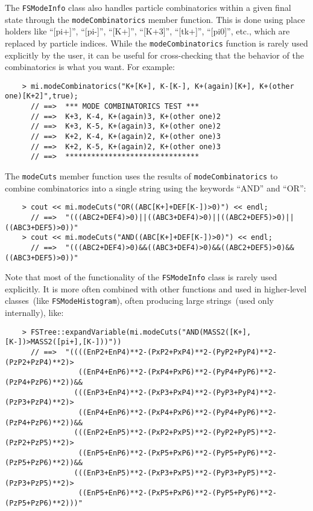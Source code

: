 \documentclass[11pt]{article}
\begin{document}
The {\tt FSModeInfo} class also handles particle combinatorics within a given final state through the {\tt modeCombinatorics} member function.  This is done using place holders like ``[pi+]'', ``[pi-]'', ``[K+]'', ``[K+3]'', ``[tk+]'', ``[pi0]'', etc., which are replaced by particle indices.  While the {\tt modeCombinatorics} function is rarely used explicitly by the user, it can be useful for cross-checking that the behavior of the combinatorics is what you want. For example:
\begin{verbatim}
    > mi.modeCombinatorics("K+[K+], K-[K-], K+(again)[K+], K+(other one)[K+2]",true);
      // ==>  *** MODE COMBINATORICS TEST ***
      // ==>  K+3, K-4, K+(again)3, K+(other one)2
      // ==>  K+3, K-5, K+(again)3, K+(other one)2
      // ==>  K+2, K-4, K+(again)2, K+(other one)3
      // ==>  K+2, K-5, K+(again)2, K+(other one)3
      // ==>  *******************************
\end{verbatim}

The {\tt modeCuts} member function uses the results of {\tt modeCombinatorics} to combine combinatorics into a single string using the keywords ``AND'' and ``OR'':
\begin{verbatim}
    > cout << mi.modeCuts("OR((ABC[K+]+DEF[K-])>0)") << endl;
      // ==>  "(((ABC2+DEF4)>0)||((ABC3+DEF4)>0)||((ABC2+DEF5)>0)||((ABC3+DEF5)>0))"
    > cout << mi.modeCuts("AND((ABC[K+]+DEF[K-])>0)") << endl;
      // ==>  "(((ABC2+DEF4)>0)&&((ABC3+DEF4)>0)&&((ABC2+DEF5)>0)&&((ABC3+DEF5)>0))"
\end{verbatim}

Note that most of the functionality of the {\tt FSModeInfo} class is rarely used explicitly.  It is more often combined with other functions and used in higher-level classes~(like {\tt FSModeHistogram}), often producing large strings~(used only internally), like:
\begin{verbatim}
    > FSTree::expandVariable(mi.modeCuts("AND(MASS2([K+],[K-])>MASS2([pi+],[K-]))"))
      // ==>  "((((EnP2+EnP4)**2-(PxP2+PxP4)**2-(PyP2+PyP4)**2-(PzP2+PzP4)**2)>
                 ((EnP4+EnP6)**2-(PxP4+PxP6)**2-(PyP4+PyP6)**2-(PzP4+PzP6)**2))&&
                (((EnP3+EnP4)**2-(PxP3+PxP4)**2-(PyP3+PyP4)**2-(PzP3+PzP4)**2)>
                 ((EnP4+EnP6)**2-(PxP4+PxP6)**2-(PyP4+PyP6)**2-(PzP4+PzP6)**2))&&
                (((EnP2+EnP5)**2-(PxP2+PxP5)**2-(PyP2+PyP5)**2-(PzP2+PzP5)**2)>
                 ((EnP5+EnP6)**2-(PxP5+PxP6)**2-(PyP5+PyP6)**2-(PzP5+PzP6)**2))&&
                (((EnP3+EnP5)**2-(PxP3+PxP5)**2-(PyP3+PyP5)**2-(PzP3+PzP5)**2)>
                 ((EnP5+EnP6)**2-(PxP5+PxP6)**2-(PyP5+PyP6)**2-(PzP5+PzP6)**2)))"
\end{verbatim} 
\end{document}
